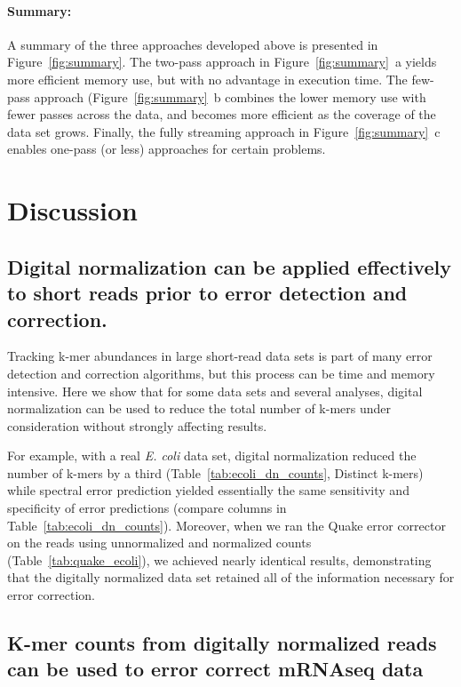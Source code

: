 \documentclass{article}
\begin{document}
\paragraph{Summary:} A summary of the three approaches developed above
is presented in Figure~\ref{fig:summary}.  The two-pass approach in
Figure~\ref{fig:summary}~a yields more efficient memory use, but with
no advantage in execution time.  The few-pass approach
(Figure~\ref{fig:summary}~b combines the lower memory use with fewer
passes across the data, and becomes more efficient as the coverage of
the data set grows.  Finally, the fully streaming approach in
Figure~\ref{fig:summary}~c enables one-pass (or less) approaches for
certain problems.

\section{Discussion}

\subsection{Digital normalization can be applied effectively to short reads prior to error detection and correction.}

Tracking k-mer abundances in large short-read data sets is part of
many error detection and correction algorithms, but this process can
be time and memory intensive.  Here we show that for some data sets
and several analyses, digital normalization can be used to reduce the
total number of k-mers under consideration without strongly affecting
results.

For example, with a real {\em E. coli} data set, digital normalization
reduced the number of k-mers by a third
(Table~\ref{tab:ecoli_dn_counts}, Distinct k-mers) while spectral
error prediction yielded essentially the same sensitivity and
specificity of error predictions (compare columns in
Table~\ref{tab:ecoli_dn_counts}).  Moreover, when we ran the Quake
error corrector on the reads using unnormalized and normalized counts
(Table~\ref{tab:quake_ecoli}), we achieved nearly identical results,
demonstrating that the digitally normalized data set retained all of the
information necessary for error correction.

\subsection{K-mer counts from digitally normalized reads can be used to error correct mRNAseq data}
\end{document}
